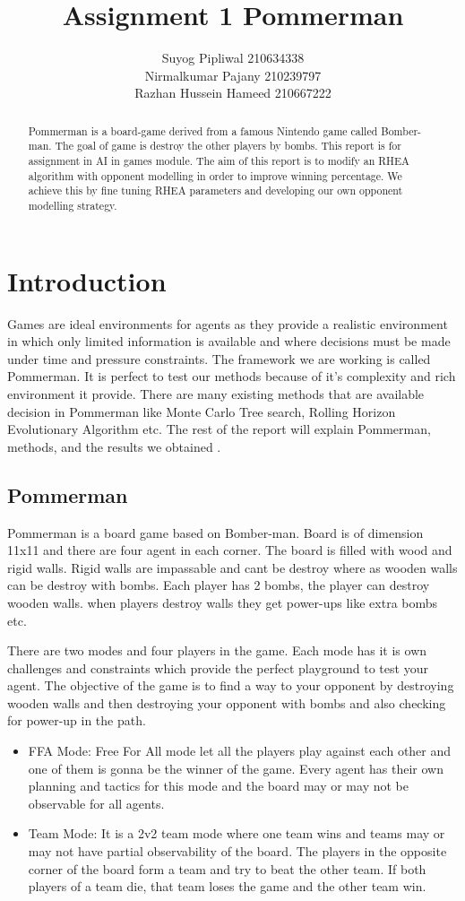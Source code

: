\documentclass{report}
\author{
	Suyog Pipliwal 210634338 \\
	Nirmalkumar Pajany 210239797 \\
	Razhan Hussein Hameed 210667222
}
\title{Assignment 1 Pommerman}
\begin{document}
	\maketitle
	\begin{abstract}
		Pommerman is a board-game derived from a famous Nintendo game called Bomber-man. The goal of game is destroy the other players by bombs. This report is for assignment in AI in games module. The aim of this report is to modify an RHEA algorithm with opponent modelling in order to improve winning percentage. We achieve this by fine tuning RHEA parameters and developing our own opponent modelling strategy. 
		
	\end{abstract}
	
	\tableofcontents
	
	\chapter{Introduction}
	Games are ideal environments for agents as they provide a realistic environment in which only limited information is available and where decisions must be made under time and pressure constraints. 
	The framework we are working is called Pommerman. It is perfect to test our methods because of it's complexity and rich environment it provide. There are many existing methods that are available decision in Pommerman like Monte Carlo Tree search\cite{browne2012survey}, Rolling Horizon Evolutionary Algorithm\cite{gaina2021rolling} etc. The rest of the report will explain Pommerman, methods, and the results we obtained . 
	\section{Pommerman}
	Pommerman is a board game based on Bomber-man. Board is of dimension 11x11 and there are four agent in each corner. The board is filled with wood and rigid walls. Rigid walls are impassable and cant be destroy where as wooden walls can be destroy with bombs. Each player has 2 bombs, the player can destroy wooden walls. when players destroy walls they get power-ups like extra bombs etc. 
	
	There are two modes and four players in the game. Each mode has it is own challenges and constraints which provide the perfect playground to test your agent.  The objective of the game is to find a way to your opponent by destroying wooden walls and then destroying your opponent with bombs and also checking for power-up in the path.  
	\begin{itemize}
		\item FFA Mode: Free For All mode let all the players play against each other and one of them is gonna be the winner of the game. Every agent has their own planning and tactics for this mode and the board may or may not be observable for all agents. 
		\item Team Mode: It is a 2v2 team mode where one team wins and teams may or may not have partial observability of the board. The players in the opposite corner of the board form a team and try to beat the other team. If both players of a team die, that team loses the game and the other team win.
	\end{itemize}
\end{document}
